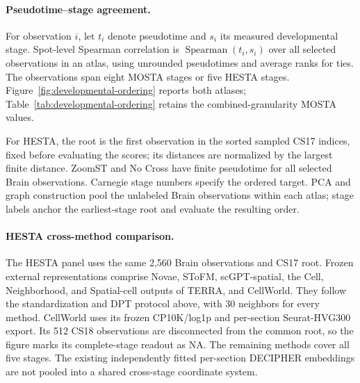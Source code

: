 \paragraph{Pseudotime--stage agreement.}
For observation $i$, let $t_i$ denote pseudotime and $s_i$ its measured developmental stage. Spot-level Spearman correlation is $\operatorname{Spearman}(t_i,s_i)$ over all selected observations in an atlas, using unrounded pseudotimes and average ranks for ties. The observations span eight MOSTA stages or five HESTA stages. Figure~\ref{fig:developmental-ordering} reports both atlases; Table~\ref{tab:developmental-ordering} retains the combined-granularity MOSTA values.

For HESTA, the root is the first observation in the sorted sampled CS17 indices, fixed before evaluating the scores; its distances are normalized by the largest finite distance. ZoomST and No Cross have finite pseudotime for all selected Brain observations. Carnegie stage numbers specify the ordered target. PCA and graph construction pool the unlabeled Brain observations within each atlas; stage labels anchor the earliest-stage root and evaluate the resulting order.

\paragraph{HESTA cross-method comparison.}
The HESTA panel uses the same 2,560 Brain observations and CS17 root. Frozen external representations comprise Novae, SToFM, scGPT-spatial, the Cell, Neighborhood, and Spatial-cell outputs of TERRA, and CellWorld. They follow the standardization and DPT protocol above, with 30 neighbors for every method. CellWorld uses its frozen CP10K/log1p and per-section Seurat-HVG300 export. Its 512 CS18 observations are disconnected from the common root, so the figure marks its complete-stage readout as NA. The remaining methods cover all five stages. The existing independently fitted per-section DECIPHER embeddings are not pooled into a shared cross-stage coordinate system.

\begin{table}[!htbp]
\centering\scriptsize
\caption{\textbf{MOSTA Joint readouts by granularity.} AMI means follow Table~\ref{tab:cross-granularity-ami}a; SD is the sample SD across three downstream clustering runs. Neighbor retention is equal-section physical 32-neighbor recovery. Spot-level correlation uses the 4,712-observation Brain cohort. Bold marks the higher value in each pair, including ties.}
\label{tab:joint-scale-comparison}
\setlength{\tabcolsep}{2.2pt}
\renewcommand{\arraystretch}{1.18}

\end{table}


